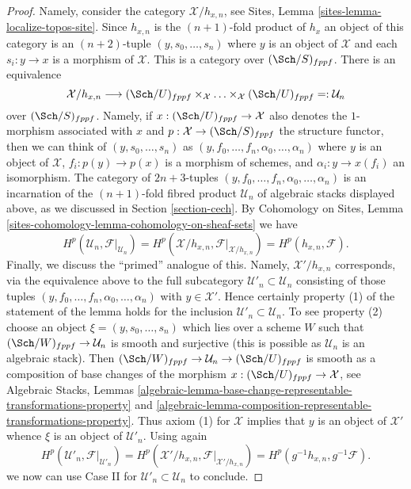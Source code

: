 \begin{proof}
\medskip\noindent
Namely, consider the category $\mathcal{X}/h_{x, n}$, see
Sites, Lemma \ref{sites-lemma-localize-topos-site}.
Since $h_{x, n}$ is the $(n + 1)$-fold product of $h_x$ an
object of this category is an $(n + 2)$-tuple
$(y, s_0, \ldots, s_n)$ where $y$ is an object of $\mathcal{X}$ and each
$s_i : y \to x$ is a morphism of $\mathcal{X}$.
This is a category over $(\Sch/S)_{fppf}$. There is an equivalence
$$
\mathcal{X}/h_{x, n}
\longrightarrow
(\Sch/U)_{fppf} \times_\mathcal{X} \ldots \times_\mathcal{X} (\Sch/U)_{fppf}
=: \mathcal{U}_n
$$
over $(\Sch/S)_{fppf}$. Namely, if $x : (\Sch/U)_{fppf} \to \mathcal{X}$ also
denotes the $1$-morphism associated with $x$ and
$p : \mathcal{X} \to (\Sch/S)_{fppf}$ the structure functor,
then we can think of $(y, s_0, \ldots, s_n)$ as
$(y, f_0, \ldots, f_n, \alpha_0, \ldots, \alpha_n)$
where $y$ is an object of $\mathcal{X}$, $f_i : p(y) \to p(x)$ is a
morphism of schemes, and $\alpha_i : y \to x(f_i)$ an isomorphism.
The category of $2n+3$-tuples
$(y, f_0, \ldots, f_n, \alpha_0, \ldots, \alpha_n)$
is an incarnation of the $(n + 1)$-fold fibred product $\mathcal{U}_n$
of algebraic stacks displayed above, as we discussed in
Section \ref{section-cech}.
By Cohomology on Sites, Lemma
\ref{sites-cohomology-lemma-cohomology-on-sheaf-sets}
we have
$$
H^p(\mathcal{U}_n, \mathcal{F}|_{\mathcal{U}_n}) =
H^p(\mathcal{X}/h_{x, n}, \mathcal{F}|_{\mathcal{X}/h_{x, n}}) =
H^p(h_{x, n}, \mathcal{F}).
$$
Finally, we discuss the ``primed'' analogue of this. Namely,
$\mathcal{X}'/h_{x, n}$ corresponds, via the equivalence above
to the full subcategory $\mathcal{U}'_n \subset \mathcal{U}_n$
consisting of those tuples
$(y, f_0, \ldots, f_n, \alpha_0, \ldots, \alpha_n)$
with $y \in \mathcal{X}'$. Hence certainly property (1) of the
statement of the lemma holds
for the inclusion $\mathcal{U}'_n \subset \mathcal{U}_n$.
To see property (2) choose an object $\xi = (y, s_0, \ldots, s_n)$ which
lies over a scheme $W$ such that $(\Sch/W)_{fppf} \to \mathcal{U}_n$
is smooth and surjective (this is possible as $\mathcal{U}_n$ is
an algebraic stack). Then
$(\Sch/W)_{fppf} \to \mathcal{U}_n \to (\Sch/U)_{fppf}$
is smooth as a composition of base changes of the morphism
$x : (\Sch/U)_{fppf} \to \mathcal{X}$, see
Algebraic Stacks, Lemmas
\ref{algebraic-lemma-base-change-representable-transformations-property} and
\ref{algebraic-lemma-composition-representable-transformations-property}.
Thus axiom (1) for $\mathcal{X}$ implies that $y$ is an object of
$\mathcal{X}'$ whence $\xi$ is an object of $\mathcal{U}'_n$.
Using again
$$
H^p(\mathcal{U}'_n, \mathcal{F}|_{\mathcal{U}'_n}) =
H^p(\mathcal{X}'/h_{x, n}, \mathcal{F}|_{\mathcal{X}'/h_{x, n}}) =
H^p(g^{-1}h_{x, n}, g^{-1}\mathcal{F}).
$$
we now can use Case II for 
$\mathcal{U}'_n \subset \mathcal{U}_n$
to conclude.
\end{proof}















